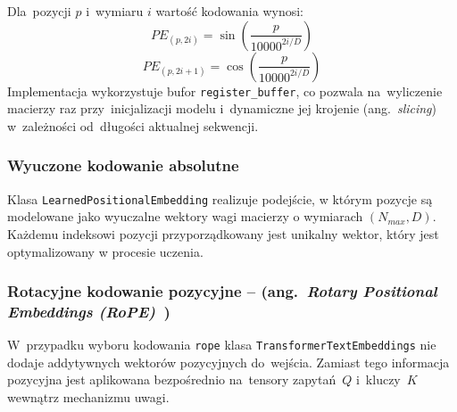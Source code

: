 \documentclass[a4paper,11pt,twoside]{report}
\theoremstyle{definition}
\begin{document}
Dla~pozycji $p$ i~wymiaru $i$ wartość kodowania wynosi:
\begin{equation}
PE_{(p, 2i)} = \sin\left(\frac{p}{10000^{2i/D}}\right) 
\end{equation}
\begin{equation}
PE_{(p, 2i+1)} = \cos\left(\frac{p}{10000^{2i/D}}\right)
\end{equation}
Implementacja wykorzystuje bufor \texttt{register\_buffer}, co pozwala na~wyliczenie macierzy raz przy~inicjalizacji modelu i~dynamiczne jej krojenie (ang.\ \emph{slicing}) w~zależności od~długości aktualnej sekwencji.



\subsubsection{Wyuczone kodowanie absolutne}
Klasa \texttt{LearnedPositionalEmbedding} realizuje podejście, w którym pozycje są modelowane jako wyuczalne wektory wagi macierzy o wymiarach $(N_{max}, D)$. Każdemu indeksowi pozycji przyporządkowany jest unikalny wektor, który jest optymalizowany w procesie uczenia.

\subsubsection{Rotacyjne kodowanie pozycyjne -- (ang.\ \emph{Rotary Positional Embeddings (RoPE)}~\cite{SU2024127063})}\label{sec:rope}

W~przypadku wyboru kodowania \texttt{rope} klasa \texttt{TransformerTextEmbeddings} nie dodaje addytywnych wektorów pozycyjnych do~wejścia.
Zamiast tego informacja pozycyjna jest aplikowana bezpośrednio na~tensory zapytań~\(Q\) i~kluczy~\(K\) wewnątrz mechanizmu uwagi.
\end{document}
